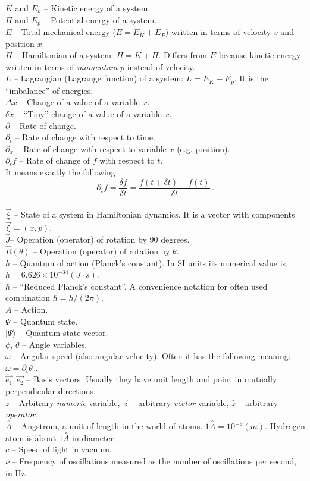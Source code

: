 $K$ and $E_k$ -- Kinetic energy of a system.\\
$\Pi$ and $E_p$ -- Potential energy of a system.\\
$E$ -- Total mechanical energy ($E=E_K+E_P$) written in terms of velocity $v$ and position $x$.\\
$H$ -- Hamiltonian of a system: $H=K+\Pi$. Differs from $E$ because
kinetic energy written in terms of \emph{momentum} $p$ instead of velocity.\\
$L$ -- Lagrangian (Lagrange function) of a system: $L=E_K-E_p$. It is the ``imbalance''
of energies.\\
$\Delta x$ -- Change of a value of a variable $x$.\\
$\delta x$ -- ``Tiny'' change of a value of a variable $x$.\\
$\partial$ -- Rate of change.\\
$\partial_{t}$ -- Rate of change with respect to time.\\
$\partial_{x}$ -- Rate of change with respect to variable $x$
(e.g. position).\\
$\partial_{t}f$ -- Rate of change of $f$ with respect to $t$.\\
It means exactly the following
\[
\partial_t f = \frac{\delta f}{\delta t}=\frac{f(t+\delta t)-f(t)}{\delta t}\,.
\]\\
$\vec{\xi}$ -- State of a system in Hamiltonian dynamics. It is a vector
with components $\vec{\xi}=(x,p)$.\\
$\hat{J}$-- Operation (operator) of rotation by 90 degrees.\\
$\hat{R}(\theta)$ -- Operation (operator) of rotation by $\theta$.\\
$h$ -- Quantum of action (Planck's constant). In SI units its numerical
value is $h=6.626\times10^{-34}(J\cdot s)$.\\
$\hbar$ -- ``Reduced Planck's constant''. A convenience notation
for often used combination $\hbar=h/(2\pi)$.\\
$A$ -- Action.\\
$\Psi$ -- Quantum state.\\
$|\Psi\rangle$ -- Quantum state vector.\\
$\phi,\,\theta$ -- Angle variables.\\
$\omega$ -- Angular speed (also angular velocity). Often it has
the following meaning: $\omega=\partial_{t}\theta$ .\\
$\vec{e_{1}},\vec{e_{2}}$ -- Basis vectors. Usually they have unit
length and point in mutually perpendicular directions.\\
$z$ -- Arbitrary \emph{numeric} variable, $\vec{z}$ -- arbitrary
\emph{vector} variable, $\hat{z}$ -- arbitrary \emph{operator}.\\
$\overset{\circ}{A}$ -- Angstrom, a unit of length in the world
of atoms. $1\overset{\circ}{A}=10^{-9}(m)$. Hydrogen atom is about
$1\overset{\circ}{A}$ in diameter.\\
$c$ -- Speed of light in vacuum.\\
$\nu$ -- Frequency of oscillations measured as the number of
oscillations per second, in Hz.
